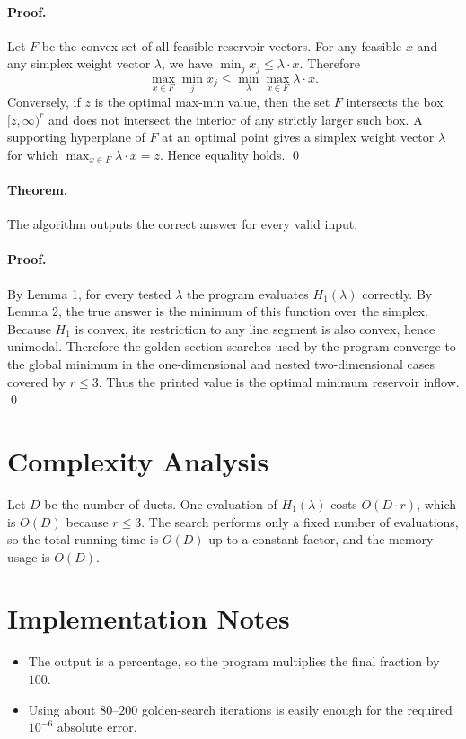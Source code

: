 \documentclass[11pt]{article}
\begin{document}
\paragraph{Proof.}
Let $F$ be the convex set of all feasible reservoir vectors. For any feasible $x$ and any simplex weight
vector $\lambda$, we have $\min_j x_j \le \lambda \cdot x$. Therefore
\[
\max_{x \in F} \min_j x_j \le \min_{\lambda} \max_{x \in F} \lambda \cdot x.
\]
Conversely, if $z$ is the optimal max-min value, then the set $F$ intersects the box
$[z,\infty)^r$ and does not intersect the interior of any strictly larger such box. A supporting
hyperplane of $F$ at an optimal point gives a simplex weight vector $\lambda$ for which
$\max_{x \in F}\lambda \cdot x = z$. Hence equality holds. \qed

\paragraph{Theorem.}
The algorithm outputs the correct answer for every valid input.

\paragraph{Proof.}
By Lemma 1, for every tested $\lambda$ the program evaluates $H_1(\lambda)$ correctly. By Lemma 2,
the true answer is the minimum of this function over the simplex. Because $H_1$ is convex, its
restriction to any line segment is also convex, hence unimodal. Therefore the golden-section searches
used by the program converge to the global minimum in the one-dimensional and nested two-dimensional
cases covered by $r \le 3$. Thus the printed value is the optimal minimum reservoir inflow. \qed

\section*{Complexity Analysis}

Let $D$ be the number of ducts. One evaluation of $H_1(\lambda)$ costs $O(D \cdot r)$, which is
$O(D)$ because $r \le 3$. The search performs only a fixed number of evaluations, so the total running
time is $O(D)$ up to a constant factor, and the memory usage is $O(D)$.

\section*{Implementation Notes}

\begin{itemize}[leftmargin=*]
    \item The output is a percentage, so the program multiplies the final fraction by $100$.
    \item Using about $80$--$200$ golden-search iterations is easily enough for the required $10^{-6}$
    absolute error.
\end{itemize}
\end{document}

